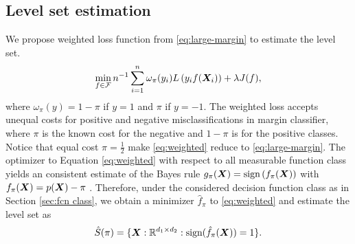 \documentclass[12pt]{article}
\begin{document}
\subsection{Level set estimation}
\label{subsec:pb2}
We propose weighted loss function from \eqref{eq:large-margin} to estimate the level set. 
\begin{align}
\label{eq:weighted}
\min_{f\in\mathcal{F}}n^{-1}\sum_{i=1}^n \omega_{\pi}(y_i)L\left(y_if(\bm X_i)\right)+ \lambda J(f),
\end{align}
where $\omega_\pi(y) = 1-\pi $ if $y = 1$ and $\pi$ if $y = -1$. The weighted loss accepts unequal costs for positive and negative misclassifications in margin classifier, where $\pi$ is the known cost for the negative and $1-\pi$ is for the positive classes. Notice that equal cost $\pi = \frac{1}{2}$ make \eqref{eq:weighted} reduce to \eqref{eq:large-margin}. 
The optimizer to Equation \eqref{eq:weighted} with respect to all measurable function class yields an consistent estimate of the Bayes rule $g_\pi(\bm X) = \text{sign}\left(f_\pi(\bm X)\right)$ with $f_\pi(\bm X) = p(\bm X) - \pi$ \citep{lin2002support,wang2008probability}. 
Therefore, under the considered decision function class as in Section \ref{sec:fcn class}, we obtain a minimizer $\hat f_\pi$ to \eqref{eq:weighted} and estimate the level set as
\begin{align}\label{eq:levelset}\hat S(\pi) = \{\bm X:\mathbb{R}^{d_1\times d_2} : \text{sign}(\hat f_\pi(\bm X)) = 1\}
.\end{align}
\end{document}

